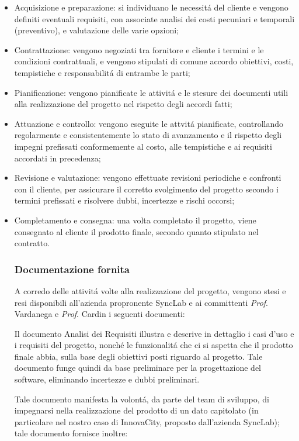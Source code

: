 \begin{itemize}
    \item Acquisizione e preparazione: si individuano le necessitá del cliente e vengono definiti eventuali requisiti, con associate analisi dei costi pecuniari e temporali (preventivo), e valutazione delle varie opzioni;
    \item Contrattazione: vengono negoziati tra fornitore e cliente i termini e le condizioni contrattuali, e vengono stipulati di comune accordo obiettivi, costi, tempistiche e responsabilitá di entrambe le parti;
    \item Pianificazione: vengono pianificate le attivitá e le stesure dei documenti utili alla realizzazione del progetto nel rispetto degli accordi fatti;
    \item Attuazione e controllo: vengono eseguite le attvitá pianificate, controllando regolarmente e consistentemente lo stato di avanzamento e il rispetto degli impegni prefissati conformemente al costo, alle tempistiche e ai requisiti accordati in precedenza;
    \item Revisione e valutazione: vengono effettuate revisioni periodiche e confronti con il cliente, per assicurare il corretto svolgimento del progetto secondo i termini prefissati e risolvere dubbi, incertezze e rischi occorsi;
    \item Completamento e consegna: una volta completato il progetto, viene consegnato al cliente il prodotto finale, secondo quanto stipulato nel contratto.
    
\subsubsection{Documentazione fornita}
A corredo delle attivitá volte alla realizzazione del progetto, vengono stesi e resi disponibili all'azienda propronente SyncLab e ai committenti \textit{Prof}. Vardanega e \textit{Prof}. Cardin i seguenti documenti:

Il documento Analisi dei Requisiti illustra e descrive in dettaglio i casi d'uso e i requisiti del progetto, nonché le funzionalitá che ci si aspetta che il prodotto finale abbia, sulla base degli obiettivi posti riguardo al progetto. Tale documento funge quindi da base preliminare per la progettazione del software, eliminando incertezze e dubbi preliminari.

Tale documento manifesta la volontá, da parte del team di sviluppo, di impegnarsi nella realizzazione del prodotto di un dato capitolato (in particolare nel nostro caso di InnovaCity, proposto dall'azienda SyncLab); tale documento fornisce inoltre:


\end{itemize}
